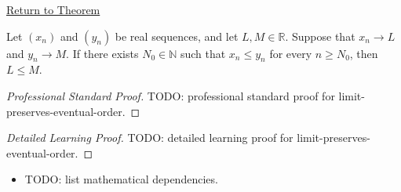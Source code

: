 \newpage
{}
\label{prf:limit-preserves-eventual-order}

\begin{remark*}[Return]
\hyperref[thm:limit-preserves-eventual-order]{Return to Theorem}
\end{remark*}

\begin{theorem*}
Let $(x_n)$ and $(y_n)$ be real sequences, and let $L,M\in\mathbb{R}$.
Suppose that $x_n\to L$ and $y_n\to M$. If there exists
$N_0\in\mathbb{N}$ such that $x_n\le y_n$ for every $n\ge N_0$, then
$L\le M$.

\smallskip
\noindent
\end{theorem*}

\begin{proof}[Professional Standard Proof]
\LRAProofBodyStart
TODO: professional standard proof for limit-preserves-eventual-order.
\end{proof}

\begin{proof}[Detailed Learning Proof]
\LRAProofBodyStart
TODO: detailed learning proof for limit-preserves-eventual-order.
\end{proof}

\begin{remark*}
\end{remark*}

\begin{dependencies}
\begin{itemize}
  \item TODO: list mathematical dependencies.
\end{itemize}
\end{dependencies}

\clearpage
